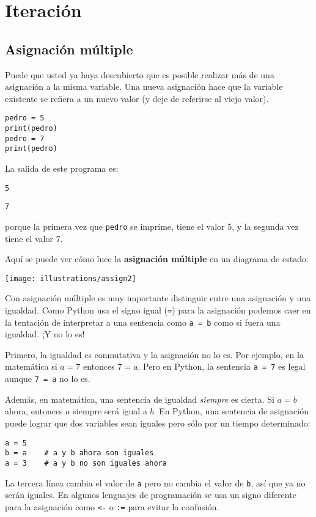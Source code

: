 
\chapter{Iteración }


\section{Asignación múltiple}

  

Puede que usted ya haya descubierto que es posible realizar más de
una asignación a la misma variable. Una nueva asignación hace que
la variable existente se refiera a un nuevo valor (y deje de referirse
al viejo valor).

\begin{lstlisting}
pedro = 5
print(pedro)
pedro = 7
print(pedro)
\end{lstlisting}
 La salida de este programa es:

\texttt{5 }

\texttt{7} 

porque la primera vez que \texttt{pedro} se imprime, tiene el valor
5, y la segunda vez tiene el valor 7.

Aquí se puede ver cómo luce la \textbf{asignación múltiple } en un
diagrama de estado:

\beforefig \centerline{\texttt{[image: illustrations/assign2]}}
\afterfig

Con asignación múltiple es muy importante distinguir entre una asignación
y una igualdad. Como Python usa el signo igual (\texttt{=}) para la
asignación podemos caer en la tentación de interpretar a una sentencia
como \texttt{a = b} como si fuera una igualdad. ¡Y no lo es!

Primero, la igualdad es conmutativa y la asignación no lo es. Por
ejemplo, en la matemática si $a=7$ entonces $7=a$. Pero en Python,
la sentencia \texttt{a = 7} es legal aunque \texttt{7 = a} no lo es.

Además, en matemática, una sentencia de igualdad \textit{siempre}
es cierta. Si $a=b$ ahora, entonces $a$ siempre será igual a $b$.
En Python, una sentencia de asignación puede lograr que dos variables
sean iguales pero sólo por un tiempo determinado:

\begin{lstlisting}
a = 5
b = a    # a y b ahora son iguales
a = 3    # a y b no son iguales ahora
\end{lstlisting}
 La tercera línea cambia el valor de \texttt{a} pero no cambia el
valor de \texttt{b}, así que ya no serán iguales. En algunos lenguajes
de programación se usa un signo diferente para la asignación como
\texttt{<-} o \texttt{:=} para evitar la confusión.

